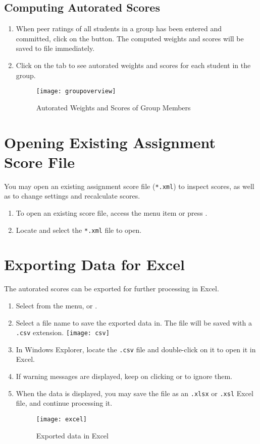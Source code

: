 \documentclass[a4paper,11pt]{refart}
\begin{document}
\subsection{Computing Autorated Scores}
\begin{enumerate}
\item When peer ratings of all students in a group has been entered and committed, click on the  button. The computed weights and scores will be saved to file immediately.
\item Click on the  tab to see autorated weights and scores for each student in the group.

\begin{figure}[hbt!]
\texttt{[image: groupoverview]}
\caption{Autorated Weights and Scores of Group Members}
\end{figure}

\end{enumerate}

\section{Opening Existing Assignment Score File}
You may open an existing assignment score file (\texttt{*.xml}) to inspect scores, as well as to change settings and recalculate scores.
\begin{enumerate}
\item To open an existing score file, access the menu item  or press .
\item Locate and select the \texttt{*.xml} file to open.
\end{enumerate}

\section{Exporting Data for Excel}
The autorated scores can be exported for further processing in Excel.
\begin{enumerate}
\item Select  from the menu, or .
\item Select a file name to save the exported data in. The file will be saved with a \texttt{.csv} extension. \texttt{[image: csv]}
\item In Windows Explorer, locate the \texttt{.csv} file and double-click on it to open it in Excel.
\item If warning messages are displayed, keep on clicking  or  to ignore them.
\item When the data is displayed, you may save the file as an \texttt{.xlsx} or \texttt{.xsl} Excel file, and continue processing it.

\begin{figure}[hbt!]
\texttt{[image: excel]}
\caption{Exported data in Excel}
\end{figure}

\end{enumerate}



\end{document}
